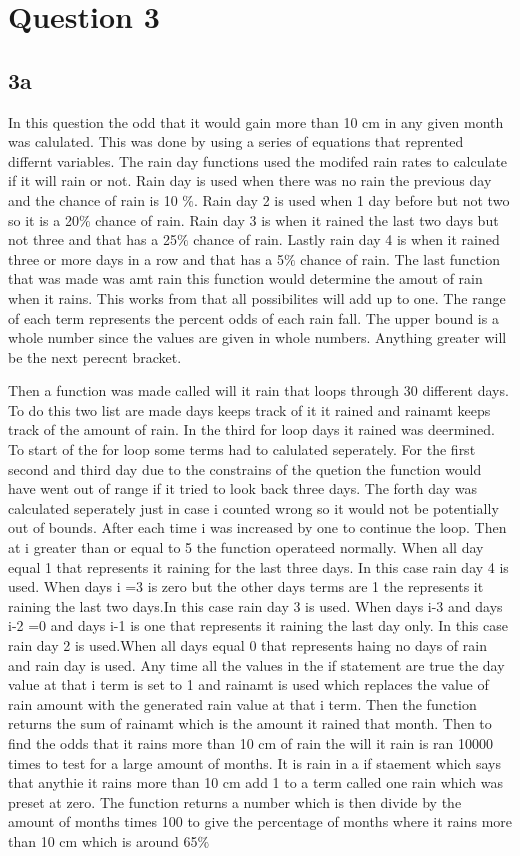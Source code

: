 \documentclass[twocolumn]{revtex4}
\begin{document}
\section{Question 3}
\subsection{3a}
In this question the odd that it would gain more than 10 cm in any given month was calulated. This was done by using a series of equations that reprented differnt variables. The rain day functions used the modifed rain rates to calculate if it will rain or not. Rain day is used when there was no rain the previous day and the chance of rain  is 10 $\%$. Rain day 2 is used  when 1 day before but not two so it is a 20$\%$ chance of rain. Rain day 3 is when it rained the last two days but not three and that has a 25$\%$ chance of rain. Lastly rain day 4 is when it rained three or more days in a row and that has a 5$\%$ chance of rain.  The last function that was made was amt rain this function would determine the amout of rain when it rains. This works from that all possibilites will add up to one. The range of each term represents the percent odds of each rain fall.  The upper bound is a whole number since the values are given in whole numbers. Anything greater will be the next perecnt bracket. 

Then a function was made called will it rain that loops through 30 different days. To do this two list are made days keeps track of it it rained and rainamt keeps track of the amount of rain.  In the third for loop days it rained was deermined. To start of the for loop some terms had to calulated seperately. For the first second and third  day due to the constrains of the quetion the function would have went out of range if it tried to look back three days. The forth day was calculated seperately just in case i counted wrong  so it would not be potentially out of bounds. After each time i was increased by one to continue the loop. Then at i  greater than or equal to 5 the function operateed normally. When all day equal 1 that represents it raining for the last three days. In this case rain day 4 is used. When days  i =3 is zero but the other days terms are 1 the represents it raining the last two days.In this case rain day 3 is used. When days i-3 and days i-2 =0 and days i-1 is one that represents it raining the last day only. In this case rain day 2 is used.When all days equal 0 that represents haing no days of rain and rain day is used.
Any time all the values in the if statement are true the day value at that i term is set to 1 and rainamt is used which replaces the value of rain amount with the generated rain value at that i term. Then the function returns the sum of rainamt which is the amount it rained that month.
Then to find the odds that it rains more than 10 cm of rain the will it rain is ran 10000 times to test for a large amount of months. It is rain in a if staement which says that anythie it rains more than 10 cm add 1 to a term called one rain which was preset at zero. The function returns a number which is then divide by the amount of months times 100 to give the percentage of months where it rains more than 10 cm which is around 65$\%$
\end{document}
